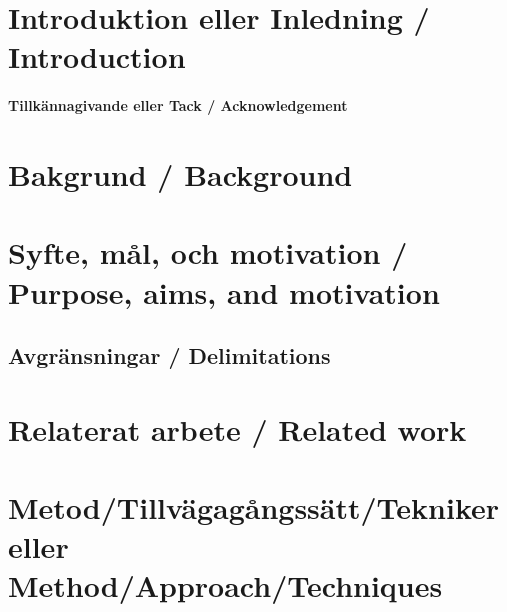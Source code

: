 \documentclass[a4paper,12pt]{article}
\begin{document}
\tableofcontents


\cleardoublepage


\newpage

\mainmatter


\section{Introduktion eller Inledning / Introduction}


\paragraph{Tillkännagivande eller Tack / Acknowledgement}



\section{Bakgrund / Background}


\section{Syfte, mål, och motivation / Purpose, aims, and motivation}\label{sec:syfte}


\subsection{Avgränsningar / Delimitations}


\section{Relaterat arbete / Related work}


\section{Metod/Tillvägagångssätt/Tekniker eller Method/Approach/Techniques}

\end{document}
